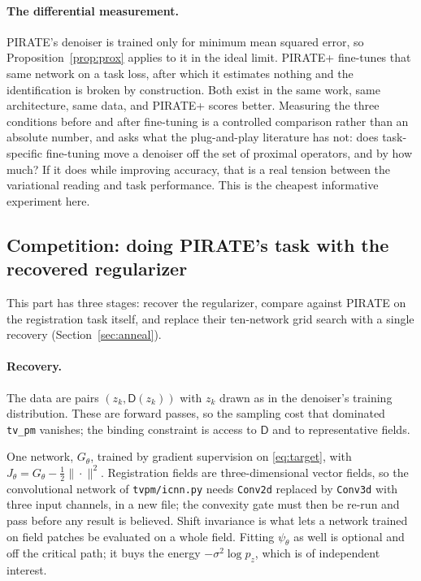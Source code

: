 \documentclass[11pt]{article}
\theoremstyle{definition}
\newcommand{\D}{\mathsf{D}}
\newcommand{\code}[1]{\texttt{#1}}
\begin{document}
\paragraph{The differential measurement.} PIRATE's denoiser is trained only for minimum mean squared error, so Proposition~\ref{prop:prox} applies to it in the ideal limit. PIRATE+ fine-tunes that same network on a task loss, after which it estimates nothing and the identification is broken by construction. Both exist in the same work, same architecture, same data, and PIRATE+ scores better. Measuring the three conditions before and after fine-tuning is a controlled comparison rather than an absolute number, and asks what the plug-and-play literature has not: does task-specific fine-tuning move a denoiser off the set of proximal operators, and by how much? If it does while improving accuracy, that is a real tension between the variational reading and task performance. This is the cheapest informative experiment here.

\subsection{Competition: doing PIRATE's task with the recovered regularizer}
\label{sec:tier2}

This part has three stages: recover the regularizer, compare against PIRATE on the registration task itself, and replace their ten-network grid search with a single recovery (Section~\ref{sec:anneal}).

\paragraph{Recovery.} The data are pairs $(z_k,\D(z_k))$ with $z_k$ drawn as in the denoiser's training distribution. These are forward passes, so the sampling cost that dominated \code{tv\_pm} vanishes; the binding constraint is access to $\D$ and to representative fields.

One network, $G_\theta$, trained by gradient supervision on \eqref{eq:target}, with $J_\theta = G_\theta - \tfrac12\|\cdot\|^2$. Registration fields are three-dimensional vector fields, so the convolutional network of \code{tvpm/icnn.py} needs \code{Conv2d} replaced by \code{Conv3d} with three input channels, in a new file; the convexity gate must then be re-run and pass before any result is believed. Shift invariance is what lets a network trained on field patches be evaluated on a whole field. Fitting $\psi_\theta$ as well is optional and off the critical path; it buys the energy $-\sigma^2\log p_z$, which is of independent interest.
\end{document}
